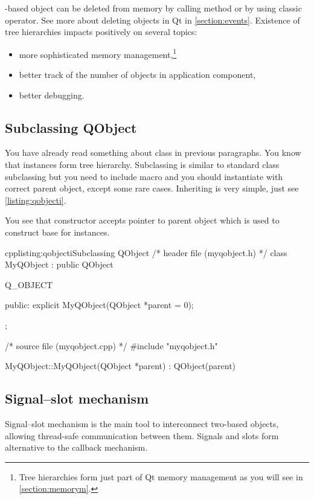 \indent{}-based object can be deleted from memory by calling method or by using classic operator. See more about deleting objects in Qt in \autoref{section:events}. Existence of tree hierarchies impacts positively on several topics:
\begin{itemize}
\item more sophisticated memory management,\footnote{Tree hierarchies form just part of Qt memory management as you will see in \autoref{section:memorym}.}
\item better track of the number of objects in application component,
\item better debugging.
\end{itemize}

\subsection{Subclassing QObject}
You have already read something about class in previous paragraphs. You know that instances form tree hierarchy. Subclassing is similar to standard \cpp{} class subclassing but you need to include macro and you should instantiate with correct parent object, except some rare cases. Inheriting is very simple, just see \autoref{listing:qobjecti}.

You see that constructor accepts pointer to parent object which is used to construct base for instances.

\begin{fdoccode}{cpp}{listing:qobjecti}{Subclassing QObject}
/* header file (myqobject.h) */
class MyQObject : public QObject {
	Q_OBJECT
	
    public:
		explicit MyQObject(QObject *parent = 0);
};

/* source file (myqobject.cpp) */
#include "myqobject.h"


MyQObject::MyQObject(QObject *parent) : QObject(parent) {
}
\end{fdoccode}

\subsection{Signal--slot mechanism}
Signal--slot mechanism is the main tool to interconnect two-based objects, allowing thread-safe communication between them. Signals and slots form alternative to the callback mechanism. 

